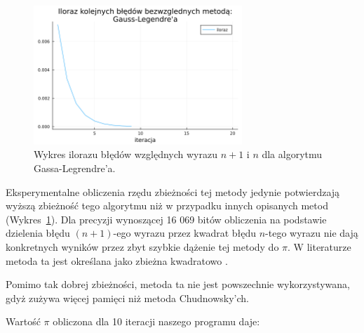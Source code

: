 \begin{figure}[!h]
    \centering
    \renewcommand{\figurename}{Wykres}
    \includegraphics[width=0.7\textwidth]{../prog/gauss_legendre_error_ratio.png}
    \caption{Wykres ilorazu błędów względnych wyrazu $n+1$ i $n$ dla algorytmu Gassa-Legrendre'a.}
    \label{gauss-convergence}
\end{figure}

Eksperymentalne obliczenia rzędu zbieżności tej metody jedynie potwierdzają wyższą zbieżność tego algorytmu niż w przypadku innych opisanych metod (Wykres~\ref{gauss-convergence}). Dla precyzji wynoszącej 16 069 bitów obliczenia na podstawie dzielenia błędu $(n+1)$-ego wyrazu przez kwadrat błędu $n$-tego wyrazu nie dają konkretnych wyników przez zbyt szybkie dążenie tej metody do $\pi$. W literaturze metoda ta jest określana jako zbieżna kwadratowo \cite{gausse-smth}.

Pomimo tak dobrej zbieżności, metoda ta nie jest powszechnie wykorzystywana, gdyż zużywa więcej pamięci niż metoda Chudnowsky'ch.

\newpage

Wartość $\pi$ obliczona dla 10 iteracji naszego programu daje:


